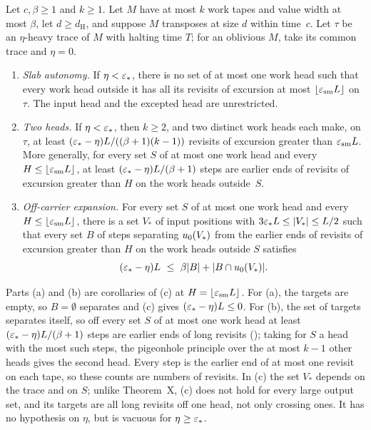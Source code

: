 \begin{theorem}\label{thm:H}
Let $c,\beta\ge1$ and $k\ge1$. Let $M$ have at most $k$ work tapes and value width at most $\beta$, let $d\ge d_{\mathrm{H}}$, and suppose $M$
transposes at size $d$ within time~$c$. Let $\tau$ be an $\eta$-heavy trace of $M$ with halting time $T$; for an oblivious $M$, take its
common trace and $\eta=0$.
\begin{enumerate}[label=(\alph*)]
\item \emph{Slab autonomy.} If $\eta<\varepsilon_*$, there is no set of at most one work head such that every work head outside it has all its
revisits of excursion at most $\lfloor\varepsilon_{\mathrm{sm}}L\rfloor$ on~$\tau$. The input head and the excepted head are unrestricted.
\item \emph{Two heads.} If $\eta<\varepsilon_*$, then $k\ge2$, and two distinct work heads each make, on $\tau$, at least
$(\varepsilon_*-\eta)L/((\beta+1)(k-1))$ revisits of excursion greater than $\varepsilon_{\mathrm{sm}}L$. More generally, for every set $S$ of at
most one work head and every $H\le\lfloor\varepsilon_{\mathrm{sm}}L\rfloor$, at least $(\varepsilon_*-\eta)L/(\beta+1)$ steps are earlier ends of
revisits of excursion greater than $H$ on the work heads outside~$S$.
\item \emph{Off-carrier expansion.} For every set $S$ of at most one work head and every $H\le\lfloor\varepsilon_{\mathrm{sm}}L\rfloor$, there is a
set $V_*$ of input positions with $3\varepsilon_*L\le\lvert V_* \rvert\le L/2$ such that every set $B$ of steps separating $u_0(V_*)$ from the earlier
ends of revisits of excursion greater than $H$ on the work heads outside $S$ satisfies
\[
  (\varepsilon_*-\eta)L\ \le\ \beta\lvert B \rvert+\lvert B\cap u_0(V_*) \rvert .
\]
\end{enumerate}
\end{theorem}

Parts (a) and (b) are corollaries of (c) at $H=\lfloor\varepsilon_{\mathrm{sm}}L\rfloor$. For (a), the targets are empty, so $B=\emptyset$
separates and (c) gives $(\varepsilon_*-\eta)L\le0$. For (b), the set of targets separates itself, so off every set $S$ of at most one work
head at least $(\varepsilon_*-\eta)L/(\beta+1)$ steps are earlier ends of long revisits (); taking for $S$
a head with the most such steps, the pigeonhole principle over the at most $k-1$ other heads gives the second head. Every step is the
earlier end of at most one revisit on each tape, so these counts are numbers of revisits. In (c) the set $V_*$ depends on the trace and on $S$; unlike
Theorem~X, (c) does not hold for every large output set, and its targets are all long revisits off one head, not only crossing
ones. It has no hypothesis on $\eta$, but is vacuous for $\eta\ge\varepsilon_*$.

